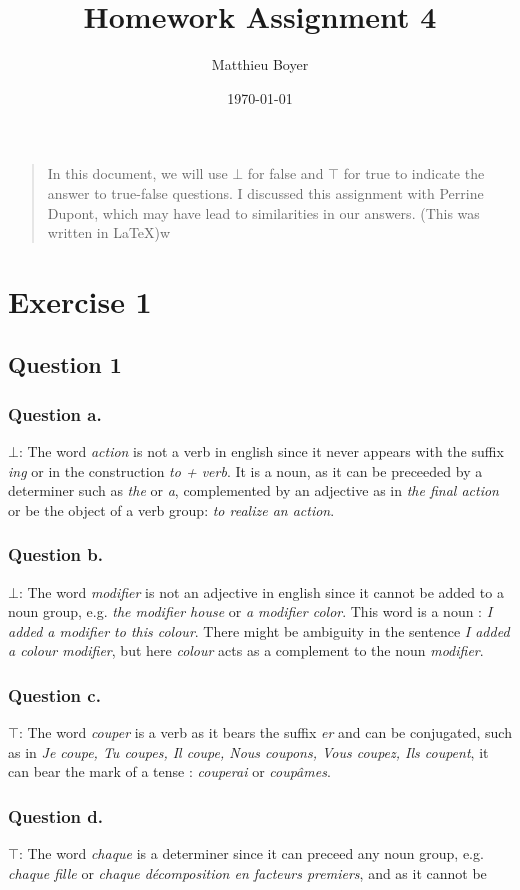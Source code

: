 \documentclass{cours}
\date{\today}
\title{Homework Assignment 4}
\author{Matthieu Boyer}
\begin{document}
\begin{quote}
    In this document, we will use $\bot$ for \textmd{false} and $\top$ for \textmd{true} to indicate the answer to true-false questions. I discussed this assignment with Perrine Dupont, which may have lead to similarities in our answers. (This was written in \LaTeX)w
\end{quote}

\section{Exercise 1}
\subsection{Question 1}
\tocless\subsubsection{Question a.}
$\bot$: The word \textsl{action} is not a verb in english since it never appears with the suffix \textsl{ing} or in the construction \textsl{to + verb}. It is a noun, as it can be preceeded by a determiner such as \textsl{the} or \textsl{a}, complemented by an adjective as in \textsl{the final action} or be the object of a verb group: \textsl{to realize an action}.

\tocless\subsubsection{Question b.}
$\bot$: The word \textsl{modifier} is not an adjective in english since it cannot be added to a noun group, e.g. \textsl{the modifier house} or \textsl{a modifier color}. This word is a noun : \textsl{I added a modifier to this colour}. There might be ambiguity in the sentence \textsl{I added a colour modifier}, but here \textsl{colour} acts as a complement to the noun \textsl{modifier}.

\tocless\subsubsection{Question c.}
$\top$: The word \textsl{couper} is a verb as it bears the suffix \textsl{er} and can be conjugated, such as in \textsl{Je coupe, Tu coupes, Il coupe, Nous coupons, Vous coupez, Ils coupent}, it can bear the mark of a tense : \textsl{couperai} or \textsl{coupâmes}. 

\tocless\subsubsection{Question d.}
$\top$: The word \textsl{chaque} is a determiner since it can preceed any noun group, e.g. \textsl{chaque fille} or \textsl{chaque décomposition en facteurs premiers}, and as it cannot be 
\end{document}
